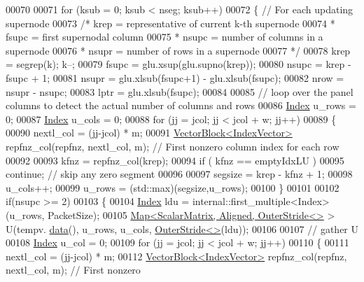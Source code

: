 \begin{DoxyCode}
00070   
00071   \textcolor{keywordflow}{for} (ksub = 0; ksub < nseg; ksub++)
00072   \{ \textcolor{comment}{// For each updating supernode}
00073     \textcolor{comment}{/* krep = representative of current k-th supernode}
00074 \textcolor{comment}{     * fsupc =  first supernodal column}
00075 \textcolor{comment}{     * nsupc = number of columns in a supernode}
00076 \textcolor{comment}{     * nsupr = number of rows in a supernode}
00077 \textcolor{comment}{     */}
00078     krep = segrep(k); k--; 
00079     fsupc = glu.xsup(glu.supno(krep)); 
00080     nsupc = krep - fsupc + 1; 
00081     nsupr = glu.xlsub(fsupc+1) - glu.xlsub(fsupc); 
00082     nrow = nsupr - nsupc; 
00083     lptr = glu.xlsub(fsupc); 
00084     
00085     \textcolor{comment}{// loop over the panel columns to detect the actual number of columns and rows}
00086     \hyperlink{namespace_eigen_a62e77e0933482dafde8fe197d9a2cfde}{Index} u\_rows = 0;
00087     \hyperlink{namespace_eigen_a62e77e0933482dafde8fe197d9a2cfde}{Index} u\_cols = 0;
00088     \textcolor{keywordflow}{for} (jj = jcol; jj < jcol + w; jj++)
00089     \{
00090       nextl\_col = (jj-jcol) * m; 
00091       \hyperlink{group___core___module_class_eigen_1_1_vector_block}{VectorBlock<IndexVector>} repfnz\_col(repfnz, nextl\_col, m); \textcolor{comment}{// First nonzero
       column index for each row}
00092       
00093       kfnz = repfnz\_col(krep); 
00094       \textcolor{keywordflow}{if} ( kfnz == emptyIdxLU ) 
00095         \textcolor{keywordflow}{continue}; \textcolor{comment}{// skip any zero segment}
00096       
00097       segsize = krep - kfnz + 1;
00098       u\_cols++;
00099       u\_rows = (std::max)(segsize,u\_rows);
00100     \}
00101     
00102     \textcolor{keywordflow}{if}(nsupc >= 2)
00103     \{ 
00104       \hyperlink{namespace_eigen_a62e77e0933482dafde8fe197d9a2cfde}{Index} ldu = internal::first\_multiple<Index>(u\_rows, PacketSize);
00105       \hyperlink{group___core___module_class_eigen_1_1_map}{Map<ScalarMatrix, Aligned,  OuterStride<>} > U(tempv.
      \hyperlink{class_eigen_1_1_plain_object_base_ac25699535374b1854cf8494e44ad31b2}{data}(), u\_rows, u\_cols, \hyperlink{class_eigen_1_1_outer_stride}{OuterStride<>}(ldu));
00106       
00107       \textcolor{comment}{// gather U}
00108       \hyperlink{namespace_eigen_a62e77e0933482dafde8fe197d9a2cfde}{Index} u\_col = 0;
00109       \textcolor{keywordflow}{for} (jj = jcol; jj < jcol + w; jj++)
00110       \{
00111         nextl\_col = (jj-jcol) * m; 
00112         \hyperlink{group___core___module_class_eigen_1_1_vector_block}{VectorBlock<IndexVector>} repfnz\_col(repfnz, nextl\_col, m); \textcolor{comment}{// First nonzero
}
\end{DoxyCode}
